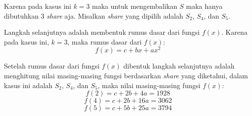 Karena pada kasus ini \begin{math}k=3\end{math} maka untuk mengembalikan \begin{math}S\end{math} maka hanya dibutuhkan 3 \textit{share} aja. Misalkan \textit{share} yang dipilih adalah \begin{math}S_2\end{math}, \begin{math}S_4\end{math}, dan \begin{math}S_5\end{math}.

Langkah selanjutnya adalah membentuk rumus dasar dari fungsi \begin{math}f(x)\end{math}. Karena pada kasus ini, \begin{math}k=3\end{math}, maka rumus dasar dari \begin{math}f(x)\end{math}:
\begin{displaymath}
	f(x) = c + bx + ax^2
\end{displaymath}

Setelah rumus dasar dari fungsi \begin{math}f(x)\end{math} dibentuk langkah selanjutnya adalah menghitung nilai masing-masing fungsi berdasarkan \textit{share} yang diketahui, dalam kasus ini adalah \begin{math}S_2\end{math}, \begin{math}S_4\end{math}, dan \begin{math}S_5\end{math}, maka nilai masing-masing fungsi \begin{math}f(x)\end{math}:
\begin{displaymath}
	f(2) = c + 2b + 4a = 1928
\end{displaymath}
\begin{displaymath}
	f(4) = c + 2b + 16a = 3062
\end{displaymath}
\begin{displaymath}
	f(5) = c + 5b + 25a = 3794
\end{displaymath}

